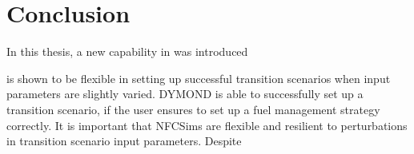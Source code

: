 \chapter{Conclusion}


In this thesis, a new capability in \Cyclus was introduced 

\Cyclus is shown to be flexible in setting up successful transition 
scenarios when input parameters are slightly varied.
DYMOND is able to successfully set up a transition scenario, if the 
user ensures to set up a fuel management strategy correctly. 
It is important that \glspl{NFCSim} are flexible and resilient to 
perturbations in transition scenario input parameters. 
Despite 

